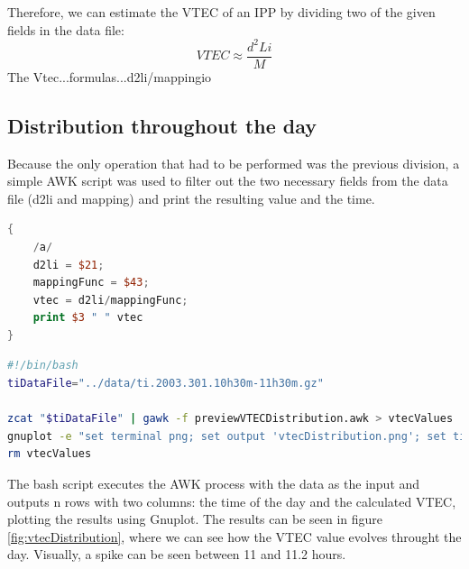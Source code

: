 Therefore, we can estimate the VTEC of an IPP by dividing two of the given fields in the data file:
\begin{equation} \label{eq:2}
	VTEC \approx \frac{d^{2}Li}{M}
\end{equation}
The Vtec...formulas...d2li/mappingio


\subsection{Distribution throughout the day}

Because the only operation that had to be performed was the previous division, a simple AWK script was used to filter out the two necessary fields from the data file (d2li and  mapping) and print the resulting value and the time. 

\begin{lstlisting}[language=Awk, caption=process]
{
	/a/
	d2li = $21;
	mappingFunc = $43;
	vtec = d2li/mappingFunc;
	print $3 " " vtec
}
\end{lstlisting}

\begin{lstlisting}[language=Bash, caption=Bash script to execute the procedures]
#!/bin/bash
tiDataFile="../data/ti.2003.301.10h30m-11h30m.gz"

zcat "$tiDataFile" | gawk -f previewVTECDistribution.awk > vtecValues
gnuplot -e "set terminal png; set output 'vtecDistribution.png'; set title 'VTEC Distribution'; set xlabel 'Time of the day (hours)'; set ylabel 'VTEC'; set grid; plot \"vtecValues\" using 1:2 with point"
rm vtecValues
\end{lstlisting}
\clearpage

The bash script executes the AWK process with the data as the input and outputs n rows with two columns: the time of the day and the calculated VTEC, plotting the results using Gnuplot.
The results can be seen in figure \ref{fig:vtecDistribution}, where we can see how the VTEC value evolves throught the day. Visually, a spike can be seen between 11 and 11.2 hours.

